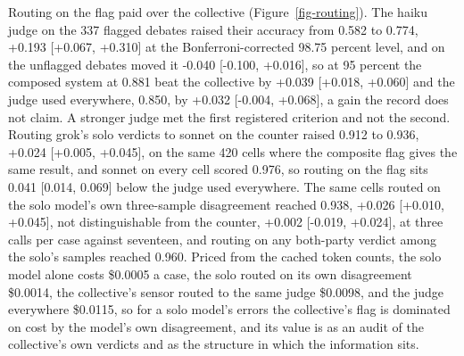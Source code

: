 Routing on the flag paid over the collective (Figure~\ref{fig-routing}).
The haiku judge on the 337 flagged debates raised their accuracy from 0.582
to 0.774, +0.193 [+0.067, +0.310] at the Bonferroni-corrected 98.75 percent
level, and on the unflagged debates moved it -0.040 [-0.100, +0.016], so
at 95 percent the composed system at 0.881 beat the collective by +0.039
[+0.018, +0.060] and the judge used everywhere, 0.850, by +0.032
[-0.004, +0.068], a gain the record does not claim.
A stronger judge met the first registered criterion and not the second.
Routing grok's solo verdicts to sonnet on the counter raised 0.912 to
0.936, +0.024 [+0.005, +0.045], on the same 420 cells where the composite
flag gives the same result, and sonnet on every cell scored 0.976, so
routing on the flag sits 0.041 [0.014, 0.069] below the judge used
everywhere. %
The same cells routed on the solo model's own three-sample disagreement
reached 0.938, +0.026 [+0.010, +0.045], not distinguishable from the
counter, +0.002 [-0.019, +0.024], at three calls per case against
seventeen, and routing on any both-party verdict among the solo's samples
reached 0.960. %
Priced from the cached token counts, the solo model alone costs
\$0.0005 a case, the solo routed on its own disagreement \$0.0014, the
collective's sensor routed to the same judge \$0.0098, and the judge
everywhere \$0.0115, so for a solo model's errors the collective's flag
is dominated on cost by the model's own disagreement, and its value is as
an audit of the collective's own verdicts and as the structure in which
the information sits. %

